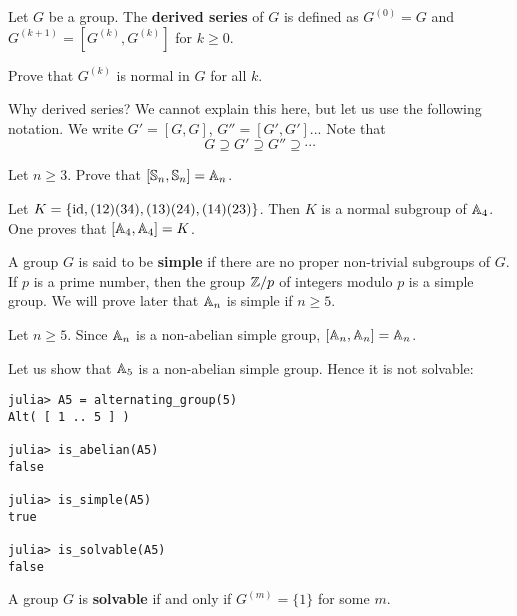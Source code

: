 \begin{definition}
    Let $G$ be a group. The \textbf{derived series} of $G$ 
    is defined as $G^{(0)}=G$ and
    $G^{(k+1)}=[G^{(k)},G^{(k)}]$ for $k\geq 0$. 
\end{definition}

\begin{exercise}
    Prove that $G^{(k)}$ is normal in $G$ for all $k$. 
\end{exercise}

Why derived series? We cannot explain this here, but let us use the following
notation. 
We write $G'=[G,G]$, $G''=[G',G']$... 
Note that 
\[
G\supseteq G'\supseteq G''\supseteq\cdots
\]


\begin{exercise}
    Let $n\geq3$. Prove that 
    $[\mathbb{S}_n,\mathbb{S}_n]=\mathbb{A}_n$. 
\end{exercise}

\begin{example}
    Let $K=\{\operatorname{id},(12)(34),(13)(24),(14)(23)\}$. Then 
    $K$ is a normal subgroup of $\mathbb{A}_4$. 
    One proves that $[\mathbb{A}_4,\mathbb{A}_4]=K$. 
\end{example}

A group $G$ is said to be \textbf{simple} 
if there are no proper non-trivial subgroups of $G$. If $p$
is a prime number, then the group 
$\mathbb{Z}/p$ of integers modulo $p$ 
is a simple group. We will prove
later that $\mathbb{A}_n$ is simple if 
$n\geq5$. 

\begin{example}
    Let $n\geq5$. Since $\mathbb{A}_n$ is a non-abelian simple group, 
    $[\mathbb{A}_n,\mathbb{A}_n]=\mathbb{A}_n$. 
\end{example}

Let us show that $\mathbb{A}_5$ is a non-abelian simple group. Hence
it is not solvable: 
\begin{lstlisting}
julia> A5 = alternating_group(5)
Alt( [ 1 .. 5 ] )

julia> is_abelian(A5)
false

julia> is_simple(A5)
true

julia> is_solvable(A5)
false
\end{lstlisting}

\begin{definition}
    A group $G$ is \textbf{solvable} if and only if
    $G^{(m)}=\{1\}$ for some $m$. 
\end{definition}

